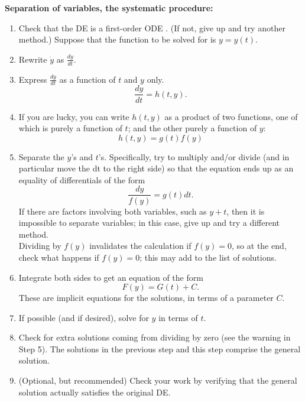 \textbf{\color{blue} Separation of variables, the systematic procedure:} \\
\begin{enumerate}
\item Check that the DE is a first-order ODE . (If not, give up and try another method.)
  Suppose that the function to be solved for is $y = y(t)$.
\item Rewrite $\dot y$ as $\displaystyle \frac{dy}{dt}$.
\item Express $\displaystyle \frac{dy}{dt}$ as a function of $t$ and $y$ only.
  \begin{equation*}
    \displaystyle \frac{dy}{dt} = h(t, y). 
  \end{equation*}
\item If you are lucky, you can write $h(t,y)$ as a product of two functions,
  one of which is purely a function of $t$; and the other purely a function of $y$:
  \begin{equation*}
    \displaystyle h(t, y) = g(t)f(y)
  \end{equation*}
\item Separate the $y$'s and $t$'s.
  Specifically, try to multiply and/or divide (and in particular move the dt to the right side) so that the equation ends up as an equality of differentials of the form
  \begin{equation*}
    \displaystyle \frac{dy}{f(y)} = g(t)dt. 
  \end{equation*}
  \Note If there are factors involving both variables, such as $y + t$,
  then it is impossible to separate variables; in this case, give up and try a different method.\\
  \Warning Dividing by $f(y)$ invalidates the calculation if $f(y) = 0$,
  so at the end, check what happens if $f(y) = 0$; this may add to the list of solutions.
  \item Integrate both sides to get an equation of the form
    \begin{equation*}
      \displaystyle F(y) = G(t) + C. 
    \end{equation*}
    These are implicit equations for the solutions, in terms of a parameter $C$.
  \item If possible (and if desired), solve for $y$ in terms of $t$.
  \item Check for extra solutions coming from dividing by zero (see the warning in Step 5).
    The solutions in the previous step and this step comprise the general solution.
  \item (Optional, but recommended) Check your work by verifying that the general solution actually
    satisfies the original DE.
\end{enumerate}

